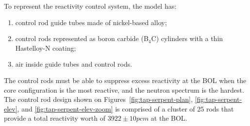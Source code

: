 To represent the reactivity control system, the model has: 
\begin{enumerate}[label=(\alph*), noitemsep, topsep=0pt]
	\item control rod guide tubes made of nickel-based alloy;
	\item control rods represented as boron carbide (B$_4$C) cylinders 
	with a thin Hastelloy-N coating;
	\item air inside guide tubes and control rods.
\end{enumerate}
The control rods must be able to suppress excess reactivity at the \gls{BOL} 
when the core configuration is the most reactive, and the neutron spectrum is 
the hardest. The control rod design shown on 
Figures~\ref{fig:tap-serpent-plan}, \ref{fig:tap-serpent-elev}, and 
\ref{fig:tap-serpent-elev-zoom} is comprised of a cluster of 25 rods that 
provide a total reactivity worth of $3922\pm10pcm$ at the \gls{BOL}.

